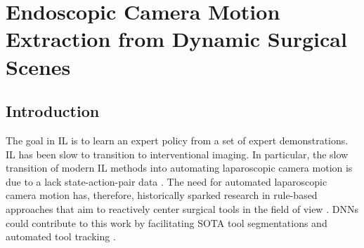 \graphicspath{{chapter_2}}
\chapter[Short tile for table of content]{Endoscopic Camera Motion Extraction from Dynamic Surgical Scenes}
\label{chap:camera_motion_extraction}
\minitoc
\section{Introduction}
The goal in IL is to learn an expert policy from a set of expert demonstrations.
IL has been slow to transition to interventional imaging. In particular, the slow transition of modern IL methods into automating laparoscopic camera motion is due to a lack state-action-pair data \cite{kassahun2016surgical, esteva2019guide}. The need for automated laparoscopic camera motion \cite{pandya2014review, ellis2016task} has, therefore, historically sparked research in rule-based approaches that aim to reactively center surgical tools in the field of view \cite{agustinos2014visual, da2020scan}. DNNs could contribute to this work by facilitating SOTA tool segmentations and automated tool tracking \cite{garcia2017toolnet, garcia2021image, gruijthuijsen2021autonomous}.



